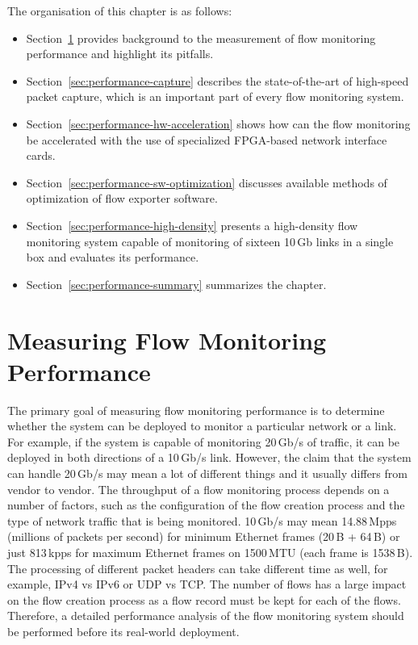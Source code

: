 \begin{chapintro}
The organisation of this chapter is as follows:
\begin{itemize}
  \item Section~\ref{sec:performance-measurement} provides background to the measurement of flow monitoring performance and highlight its pitfalls.
  \item Section~\ref{sec:performance-capture} describes the state-of-the-art of high-speed packet capture, which is an important part of every flow monitoring system.
  \item Section~\ref{sec:performance-hw-acceleration} shows how can the flow monitoring be accelerated with the use of specialized FPGA-based network interface cards.
  \item Section~\ref{sec:performance-sw-optimization} discusses available methods of optimization of flow exporter software.
  \item Section~\ref{sec:performance-high-density} presents a high-density flow monitoring system capable of monitoring of sixteen 10\,Gb links in a single box and evaluates its performance.
  \item Section~\ref{sec:performance-summary} summarizes the chapter.
\end{itemize}

\end{chapintro}

\newpage


\section{Measuring Flow Monitoring Performance}\label{sec:performance-measurement}

The primary goal of measuring flow monitoring performance is to determine whether the system can be deployed to monitor a particular network or a link. For example, if the system is capable of monitoring 20\,Gb/s of traffic, it can be deployed in both directions of a 10\,Gb/s link. However, the claim that the system can handle 20\,Gb/s may mean a lot of different things and it usually differs from vendor to vendor. The throughput of a flow monitoring process depends on a number of factors, such as the configuration of the flow creation process and the type of network traffic that is being monitored. 10\,Gb/s may mean 14.88\,Mpps (millions of packets per second) for minimum Ethernet frames (20\,B + 64\,B) or just 813\,kpps for maximum Ethernet frames on 1500\,MTU (each frame is 1538\,B). The processing of different packet headers can take different time as well, for example, IPv4 vs IPv6 or UDP vs TCP. The number of flows has a large impact on the flow creation process as a flow record must be kept for each of the flows. Therefore, a detailed performance analysis of the flow monitoring system should be performed before its real-world deployment.


